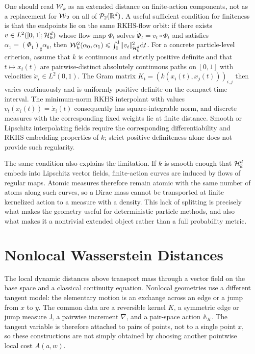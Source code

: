 One should read \(\mathcal W_k\) as an extended distance on finite-action components, not as a replacement for $\operatorname{\mathcal{W}}_2$ on all of $\mathcal{P}_2(\mathbb{R}^d)$. A useful sufficient condition for finiteness is that the endpoints lie on the same RKHS-flow orbit: if there exists \(v\in L^2([0,1];\mathcal{H}_k^d)\) whose flow map \(\Phi_t\) solves \(\dot\Phi_t=v_t\circ\Phi_t\) and satisfies \(\alpha_1=(\Phi_1)_\sharp\alpha_0\), then \(\mathcal W_k^2(\alpha_0,\alpha_1)\leqslant\int_0^1|\!| v_t |\!|_{\mathcal{H}_k^d}^2\mathrm{d} t\). For a concrete particle-level criterion, assume that $k$ is continuous and strictly positive definite and that $t\mapsto x_i(t)$ are pairwise-distinct absolutely continuous paths on $[0,1]$ with velocities $\dot x_i\in L^2(0,1)$. The Gram matrix $K_t=(k(x_i(t),x_j(t)))_{i,j}$ then varies continuously and is uniformly positive definite on the compact time interval. The minimum-norm RKHS interpolant with values $v_t(x_i(t))=\dot x_i(t)$ consequently has square-integrable norm, and discrete measures with the corresponding fixed weights lie at finite distance. Smooth or Lipschitz interpolating fields require the corresponding differentiability and RKHS embedding properties of $k$; strict positive definiteness alone does not provide such regularity.

The same condition also explains the limitation. If $k$ is smooth enough that $\mathcal{H}_k^d$ embeds into Lipschitz vector fields, finite-action curves are induced by flows of regular maps. Atomic measures therefore remain atomic with the same number of atoms along such curves, so a Dirac mass cannot be transported at finite kernelized action to a measure with a density. This lack of splitting is precisely what makes the geometry useful for deterministic particle methods, and also what makes it a nontrivial extended object rather than a full probability metric.

\section{Nonlocal Wasserstein Distances}\label{sec-nonlocal-wasserstein-distances}
The local dynamic distances above transport mass through a vector field on the base space and a classical continuity equation. Nonlocal geometries use a different tangent model: the elementary motion is an exchange across an edge or a jump from \(x\) to \(y\). The common data are a reversible kernel \(K\), a symmetric edge or jump measure \(\mathsf J\), a pairwise increment \(\bar\nabla\), and a pair-space action \(\mathbb A_K\). The tangent variable is therefore attached to pairs of points, not to a single point \(x\), so these constructions are not simply obtained by choosing another pointwise local cost \(A(a,w)\).

